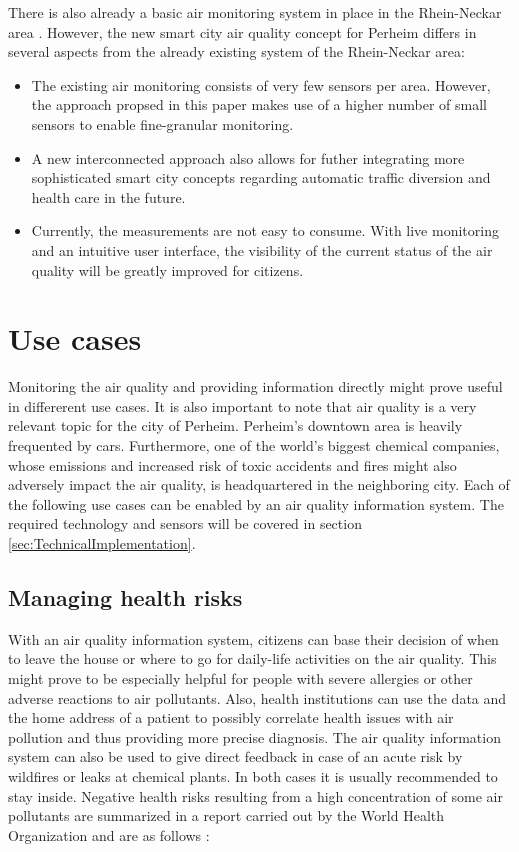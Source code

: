 \documentclass[conference]{IEEEtran}
\begin{document}
There is also already a basic air monitoring system in place in the Rhein-Neckar area \cite{LandesanstaltfurUmweltBadenWurttemberg}.
However, the new smart city air quality concept for Perheim differs in several aspects from the already existing system of the Rhein-Neckar area:
\begin{itemize} 
\item The existing air monitoring consists of very few sensors per area. However, the approach propsed in this paper makes use of a higher number of small sensors to enable fine-granular monitoring.
\item A new interconnected approach also allows for futher integrating more sophisticated smart city concepts regarding automatic traffic diversion and health care in the future.
\item Currently, the measurements are not easy to consume. With live monitoring and an intuitive user interface, the visibility of the current status of the air quality will be greatly improved for citizens.
\end{itemize} 

\section{Use cases}
Monitoring the air quality and providing information directly might prove useful in differerent use cases. It is also important to note that air quality is a very relevant topic for the city of Perheim. Perheim's downtown area is heavily frequented by cars. Furthermore, one of the world's biggest chemical companies, whose emissions and increased risk of toxic accidents and fires might also adversely impact the air quality, is headquartered in the neighboring city.
\newline \newline
Each of the following use cases can be enabled by an air quality information system. The required technology and sensors will be covered in section \ref{sec:TechnicalImplementation}.

\subsection{Managing health risks}
With an air quality information system, citizens can base their decision of when to leave the house or where to go for daily-life activities on the air quality. This might prove to be especially helpful for people with severe allergies or other adverse reactions to air pollutants. Also, health institutions can use the data and the home address of a patient to possibly correlate health issues with air pollution and thus providing more precise diagnosis. The air quality information system can also be used to give direct feedback in case of an acute risk by wildfires or leaks at chemical plants. In both cases it is usually recommended to stay inside. Negative health risks resulting from a high concentration of some air pollutants are summarized in a report carried out by the World Health Organization and are as follows \cite{WorldHealthOrganization.2013}:
\end{document}
